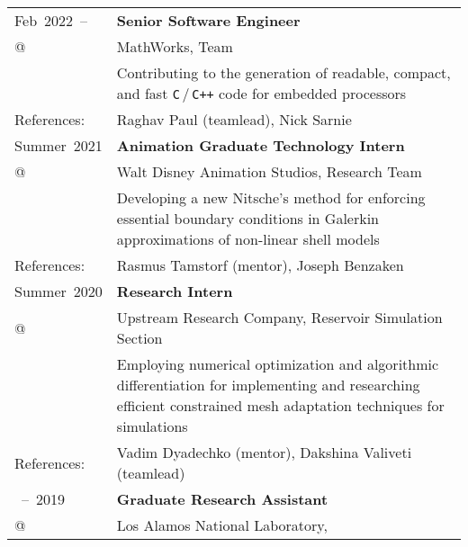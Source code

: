 \documentclass[a4paper,12pt]{article}
\makeatletter
\newcommand{\myuline}[1]{%
	\uline{\phantom{#1}}%
	\llap{\contour{bgclr}{#1}}%
}
\newcommand\xhref[2]{\href{#1}{\myuline{#2}}}
\newcommand\myrefs{\color{minorclr}References:}
\newcommand\at{\color{minorclr}@}
\makeatother
\begin{document}
	\begin{longtable}{>{\raggedleft\arraybackslash}p{2.5cm}>{\raggedright\arraybackslash}p{14.5cm}}
		Feb~2022~--
			& \textbf{Senior Software Engineer}\vspace{1mm}\\
			\at & MathWorks, \xhref{https://www.mathworks.com/products/embedded-coder.html}{Embedded Coder} Team\vspace{1mm}\\
			& Contributing to the generation of readable, compact, and fast \texttt{C}\,/\,\texttt{C++} code for embedded processors\vspace{1mm}\\
			\myrefs & Raghav Paul (teamlead), Nick Sarnie\vspace{3mm}\\
		Summer~2021
			& \textbf{Animation Graduate Technology Intern}\vspace{1mm}\\
			\at & Walt Disney Animation Studios, \xhref{https://www.disneyanimation.com/technology/}{WDAS Technology} Research Team\vspace{1mm}\\
			& Developing a new Nitsche's method for enforcing essential boundary conditions in Galerkin approximations of non-linear shell models\vspace{1mm}\\
			\myrefs & Rasmus Tamstorf (mentor), Joseph Benzaken\vspace{3mm}\\
		Summer~2020
			& \textbf{Research Intern}\vspace{1mm}\\
			\at & \xhref{https://corporate.exxonmobil.com/}{ExxonMobil} Upstream Research Company, Reservoir Simulation Section\vspace{1mm}\\
			& Employing numerical optimization and algorithmic differentiation for implementing and researching efficient constrained mesh adaptation techniques for \xhref{https://en.wikipedia.org/wiki/Hydraulic_fracturing}{hydrofrac} simulations\vspace{1mm}\\
			\myrefs & Vadim Dyadechko (mentor), Dakshina Valiveti (teamlead) \vspace{3mm}\\			
		2018~--~2019
			& \textbf{Graduate Research Assistant}\vspace{1mm}\\
			\at & Los Alamos National Laboratory, \xhref{https://www.lanl.gov/org/ddste/aldsc/theoretical/applied-mathematics-plasma-physics/index.php}{Applied Mathematics \& Plasma Physics Group}\vspace{1mm}\\

\end{longtable}
\end{document}
